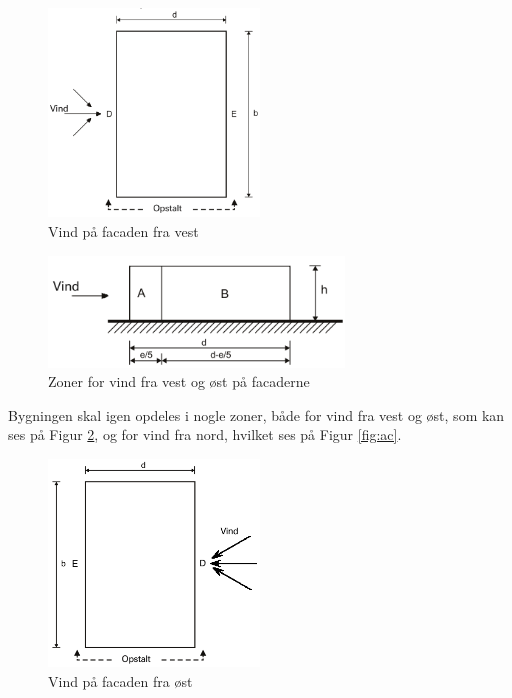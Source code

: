\begin{figure}[htbp]
	\centering
	\includegraphics[width=0.5\textwidth]{billeder/vindvest1.png}
	\caption{Vind på facaden fra vest \citep[ 7.2.2]{EU91}}
	\label{fig:vindvest}
\end{figure}

\begin{figure}[htbp]
	\centering
	\includegraphics[width=0.7\textwidth]{billeder/vestost.png}
	\caption{Zoner for vind fra vest og øst på facaderne \citep[ 7.2.2]{EU91}}
	\label{fig:ab}
\end{figure}

Bygningen skal igen opdeles i nogle zoner, både for vind fra vest og øst, som kan ses på Figur \ref{fig:ab}, og for vind fra nord, hvilket ses på Figur \ref{fig:ac}.

\begin{figure}[htbp]
	\centering
	\includegraphics[width=0.5\textwidth]{billeder/vindost1.png}
	\caption{Vind på facaden fra øst \citep[ 7.2.2]{EU91}}
	\label{fig:vindost}
\end{figure}

